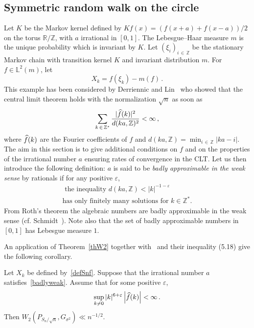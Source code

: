 \documentclass[10pt]{amsart}
\theoremstyle{definition}\newtheorem{defi}[theo]{Definition}\newtheorem{rema}[theo]{Remark}\newtheorem{exam}[theo]{Example}\newtheorem{exem}[theo]{Example}\newtheorem{nota}[theo]{Notation}
\newcommand{\bbZ}{\mathbb{Z}}
\newcommand{\bbR}{\mathbb{R}}
\newcommand{\bbL}{\mathbb{L}}
\let\oldhat\hat
\renewcommand*{\hat}[1]{\mathchoice{\widehat{#1}}{\widehat{#1}}{\oldhat{#1}}{\oldhat{#1}}}
\begin{document}
\subsection{Symmetric random walk on the circle} \label{sectcircle}

Let $K$ be the Markov kernel defined by $Kf (x) =(f (x+a) + f (x-a))/2$ on the torus $\bbR/\bbZ$, with $a$ irrational in $[0,1]$. The Lebesgue--Haar measure $m$ is the unique probability which is invariant by $K$. Let $(\xi_i)_{i\,\in\,\bbZ}$ be the stationary Markov chain with transition kernel $K$ and invariant distribution $m$. For $f \in \bbL^2(m)$, let
\begin{equation}\label{defSnf}
X_k=f(\xi_k)-m(f) \,.
\end{equation}
This example has been considered by Derriennic and Lin~\cite{DL01} who showed that the central limit theorem holds with the normalization $\sqrt{n}$ as soon as
\begin{equation}\label{Paroux}
\sum_{k\,\in\,{\bbZ}^*} \frac{|\hat f (k)|^2}{d (ka, {\bbZ})^2} < \infty
\,,
\end{equation}
where $\hat f(k)$ are the Fourier coefficients of $f$ and $d (ka, \bbZ)=\min_{i\, \in\,\bbZ} |ka-i|$. The aim in this section is to give additional conditions on $f$ and on the properties of the irrational number $a$ ensuring rates of convergence in the CLT. Let us then introduce the following definition: $a$ is said to be \emph{badly approximable in the weak sense} by rationals if for any positive $\varepsilon$,
\begin{multline}\label{badlyweak}
\text{ the inequality } d(ka, \bbZ) < |k|^{-1-\varepsilon} \\
\text{has only finitely many
solutions for }k \in \bbZ^*.
\end{multline}
From Roth's theorem the algebraic numbers are badly approximable in the weak sense (cf. Schmidt~\cite{Sc80}). Note also that the set of badly approximable numbers in $[0,1]$ has Lebesgue measure $1$.


An application of Theorem~\ref{thW2} together with~\cite[Lemma~5.2]{DR08} and their inequality (5.18) give the following corollary.



\begin{coro}\label{circle}
Let $X_k$ be defined by~\eqref{defSnf}. Suppose that the irrational number $a$ satisfies~\eqref{badlyweak}. Assume that for some positive $\varepsilon$,
\begin{equation*}\label{condirra}
\sup_{k\not= 0} |k|^{ 6 +\varepsilon} \left|\hat f (k)\right| < \infty \,.
\end{equation*}
Then $ W_2 (P_{S_n / {\sqrt n} }, G_{\sigma^2}) \ll n^{-1/2}$.
\end{coro}
\end{document}
